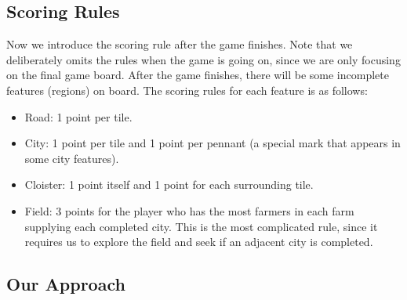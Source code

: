 \subsection{Scoring Rules}
Now we introduce the scoring rule after the game finishes.
Note that we deliberately omits the rules when the game is going on,
since we are only focusing on the final game board.
After the game finishes, there will be some incomplete features (regions)
on board. The scoring rules for each feature is as follows:
\begin{itemize}
  \item Road: 1 point per tile.
  \item City: 1 point per tile and 1 point per pennant (a special mark
    that appears in some city features).
  \item Cloister: 1 point itself and 1 point for each surrounding tile.
  \item Field: 3 points for the player who has the most farmers in each
    farm supplying each completed city. This is the most complicated rule,
    since it requires us to explore the field and seek if an adjacent city
    is completed.
\end{itemize}

\subsection{Our Approach}
